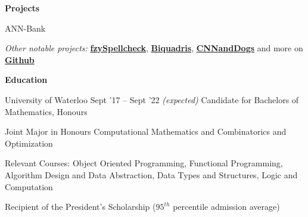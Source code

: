 \documentclass{resume} %
\begin{document}
\begin{rSection}{\textbf{Projects}}
\begin{rSubsection}{ANN-Bank}
    
  \end{rSubsection}

  \begin{rMinisection}
    \item {\em Other notable projects:}
      \href{https://github.com/MSJawad/Fuzzy-Spellcheck}{\textbf{fzySpellcheck}},
      \href{https://github.com/MiltonIp/Biquadris}{\textbf{Biquadris}},
      \href{https://github.com/MSJawad/CNNandDogs}{\textbf{CNNandDogs}} and more on
      \href{https://github.com/MSJawad}{\textbf{Github}}
  \end{rMinisection}
\end{rSection}


\begin{rSection}{\textbf{Education}}
  \begin{rSubsection}{University of Waterloo}
		     {Sept '17 -- Sept '22 \em (expected)}
		     {Candidate for Bachelors of Mathematics, Honours}
		     {}
	\item Joint Major in Honours Computational Mathematics and Combinatorics and Optimization
	\item Relevant Courses: Object Oriented Programming, Functional Programming, Algorithm Design and Data Abstraction, Data Types and Structures, Logic and Computation
    \item  Recipient of the President's Scholarship
      ($95^{th}$ percentile admission average)
  \end{rSubsection}
\end{rSection} 
\end{document}
